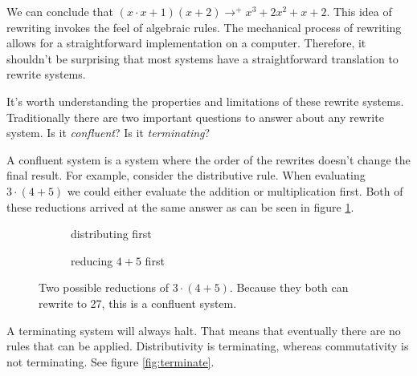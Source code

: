 \documentclass{book}
\theoremstyle{definition}
\begin{document}
We can conclude that $(x\cdot x + 1)(x + 2) \to^+ x^3 + 2x^2 + x + 2$.
This idea of rewriting invokes the feel of algebraic rules.
The mechanical process of rewriting allows for a straightforward implementation on a computer.
Therefore, it shouldn't be surprising that most systems
have a straightforward translation to rewrite systems.

It's worth understanding the properties and limitations of these rewrite systems.
Traditionally there are two important questions to answer about any rewrite system.
Is it \textit{confluent}? Is it \textit{terminating}?

A confluent system is a system where the order of the rewrites doesn't change the final result.
For example, consider the distributive rule.
When evaluating $3\cdot(4 + 5)$ we could either evaluate the addition or multiplication first.
Both of these reductions arrived at the same answer as can be seen in figure \ref{fig:confluent}.

\begin{figure}[h]
  \begin{subfigure}{.5\textwidth}
      \centering
      \caption{distributing first}
  \end{subfigure}
  \begin{subfigure}{.5\textwidth}
      \centering
      \caption{reducing $4 + 5$ first}
  \end{subfigure}
    \caption{Two possible reductions of $3\cdot(4 + 5)$.  
             Because they both can rewrite to 27, this is a confluent system.}
    \label{fig:confluent}
\end{figure}

A terminating system will always halt.
That means that eventually there are no rules that can be applied.
Distributivity is terminating, whereas commutativity is not terminating.  See figure \ref{fig:terminate}.
\end{document}
